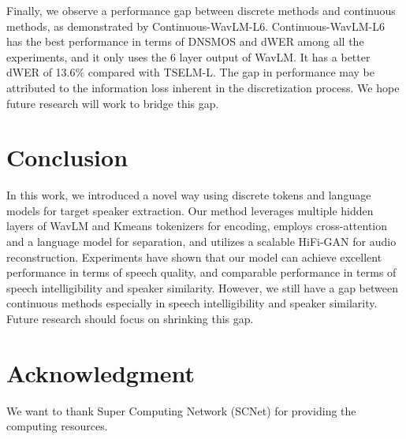 \documentclass[conference]{IEEEtran}
\begin{document}
Finally, we observe a performance gap between discrete methods and continuous methods, as demonstrated by Continuous-WavLM-L6.
Continuous-WavLM-L6 has the best performance in terms of DNSMOS and dWER among all the experiments, and it only uses the 6 layer output of WavLM. 
It has a better dWER of 13.6\% compared with TSELM-L. The gap in performance may be attributed to the information loss inherent in the discretization process. 
We hope future research will work to bridge this gap.   

\section{Conclusion}
In this work, we introduced a novel way using discrete tokens and language models for target speaker extraction.
Our method leverages multiple hidden layers of WavLM and Kmeans tokenizers for encoding, employs cross-attention and a language model for separation, and utilizes a scalable HiFi-GAN for audio reconstruction.
Experiments have 
shown that our model can achieve excellent performance in terms of speech quality, and comparable performance in terms of speech intelligibility and 
speaker similarity. However, we still have a gap between continuous methods especially in speech intelligibility and speaker similarity. Future research should focus on shrinking 
this gap. 

\section{Acknowledgment}
We want to thank Super Computing Network (SCNet) for providing the computing resources. 






\end{document}
